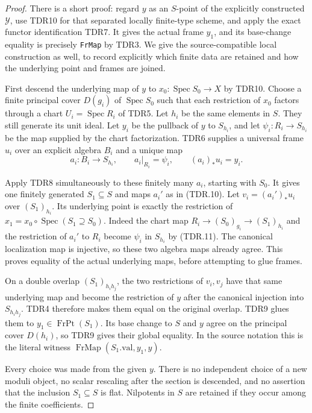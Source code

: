 \begin{proof}
There is a short proof: regard \(y\) as an \(S\)-point of
the explicitly constructed \(\mathcal Y\), use TDR10 for that
separated locally finite-type scheme, and apply the exact functor
identification TDR7.  It gives the actual frame \(y_1\), and
its base-change equality is precisely \texttt{FrMap} by TDR3.
We give the source-compatible local construction as well, to
record explicitly which finite data are retained and how the
underlying point and frames are joined.

First descend the underlying map of \(y\) to
\(x_0:\operatorname{Spec}S_0\to X\) by TDR10.
Choose a finite principal cover \(D(g_i)\) of
\(\operatorname{Spec}S_0\) such that each restriction of
\(x_0\) factors through a chart \(U_i=\operatorname{Spec}R_i\)
of TDR5.  Let \(h_i\) be the same elements in \(S\).
They still generate its unit ideal.  Let \(y_i\) be the
pullback of \(y\) to \(S_{h_i}\), and let
\(\psi_i:R_i\to S_{h_i}\) be the map supplied by the chart
factorization.  TDR6 supplies a universal frame \(u_i\) over
an explicit algebra \(B_i\) and a unique map
\[
 a_i:B_i\to S_{h_i},\qquad
 a_i|_{R_i}=\psi_i,\qquad(a_i)_*u_i=y_i.                   \tag{TDR.11}
\]

Apply TDR8 simultaneously to these finitely many \(a_i\),
starting with \(S_0\).  It gives one finitely generated
\(S_1\subseteq S\) and maps \(a_i'\) as in (TDR.10).
Let \(v_i=(a_i')_*u_i\) over \((S_1)_{h_i}\).
Its underlying point is exactly the restriction of
\(x_1=x_0\circ\operatorname{Spec}(S_1\supseteq S_0)\).
Indeed the chart map
\(R_i\to(S_0)_{g_i}\to(S_1)_{h_i}\) and the restriction
of \(a_i'\) to \(R_i\) become \(\psi_i\) in \(S_{h_i}\)
by (TDR.11).  The canonical localization map is injective,
so these two algebra maps already agree.  This proves equality
of the actual underlying maps, before attempting to glue frames.

On a double overlap \((S_1)_{h_i h_j}\), the two restrictions
of \(v_i,v_j\) have that same underlying map and become the
restriction of \(y\) after the canonical injection into
\(S_{h_i h_j}\).  TDR4 therefore makes them equal on the
original overlap.  TDR9 glues them to
\(y_1\in\operatorname{FrPt}(S_1)\).  Its base change to
\(S\) and \(y\) agree on the principal cover \(D(h_i)\),
so TDR9 gives their global equality.  In the source notation this
is the literal witness
\(\operatorname{FrMap}(S_1.\mathrm{val},y_1,y)\).

Every choice was made from the given \(y\).  There is no
independent choice of a new moduli object, no scalar rescaling
after the section is descended, and no assertion that the
inclusion \(S_1\subseteq S\) is flat.  Nilpotents in \(S\)
are retained if they occur among the finite coefficients.
\end{proof}

